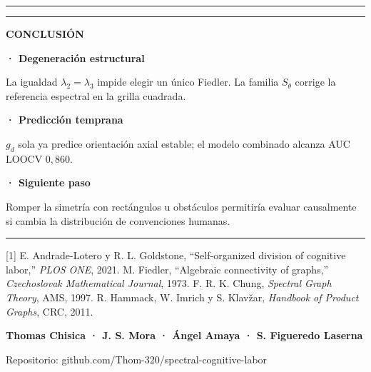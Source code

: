 \documentclass{article}
\newcommand{\eyebrow}[1]{%
  {\color{urBlue}\rule{1.1cm}{2.4pt}}\quad
  {\sffamily\bfseries\fontsize{16}{20}\selectfont\color{urBlue}\MakeUppercase{#1}}\par\vspace{0.16cm}}
\newcommand{\bodytext}[1]{%
  {\sffamily\fontsize{18.5}{24}\selectfont\color{ink}#1\par}}
\begin{document}
\vspace{1.15cm}
{\color{rule}\rule{\linewidth}{1.1pt}}
\vspace{0.75cm}

\noindent
\eyebrow{Conclusión}
\begin{minipage}[t]{0.31\textwidth}
  {\sffamily\bfseries\fontsize{28}{34} · Degeneración estructural\par}
  \bodytext{La igualdad $\lambda_2=\lambda_3$ impide elegir un único Fiedler. La familia $S_\theta$ corrige la referencia espectral en la grilla cuadrada.}
\end{minipage}
\hfill
\begin{minipage}[t]{0.31\textwidth}
  {\sffamily\bfseries\fontsize{28}{34} · Predicción temprana\par}
  \bodytext{$g_d$ sola ya predice orientación axial estable; el modelo combinado alcanza AUC LOOCV $0{,}860$.}
\end{minipage}
\hfill
\begin{minipage}[t]{0.31\textwidth}
  {\sffamily\bfseries\fontsize{28}{34} · Siguiente paso\par}
  \bodytext{Romper la simetría con rectángulos u obstáculos permitiría evaluar causalmente si cambia la distribución de convenciones humanas.}
\end{minipage}

\vfill
{\color{rule}\rule{\linewidth}{1.1pt}}
\vspace{0.3cm}
\noindent
\begin{minipage}[t]{0.74\textwidth}
  {\sffamily\fontsize{15}{20}\selectfont\color{inkSoft}
  [1] E. Andrade-Lotero y R. L. Goldstone, ``Self-organized division of cognitive labor,'' \emph{PLOS ONE}, 2021.
  \quad [2] M. Fiedler, ``Algebraic connectivity of graphs,'' \emph{Czechoslovak Mathematical Journal}, 1973.
  \quad [3] F. R. K. Chung, \emph{Spectral Graph Theory}, AMS, 1997.
  \quad [4] R. Hammack, W. Imrich y S. Klav\v{z}ar, \emph{Handbook of Product Graphs}, CRC, 2011.}
\end{minipage}
\hfill
\begin{minipage}[t]{0.23\textwidth}
  \raggedleft
  {\sffamily\bfseries\fontsize{16}{20}\selectfont Thomas Chisica · J. S. Mora · Ángel Amaya · S. Figueredo Laserna\par}
  {\sffamily\fontsize{14}{19}\selectfont\color{inkSoft}Repositorio: github.com/Thom-320/spectral-cognitive-labor\par}
\end{minipage}
\end{document}
